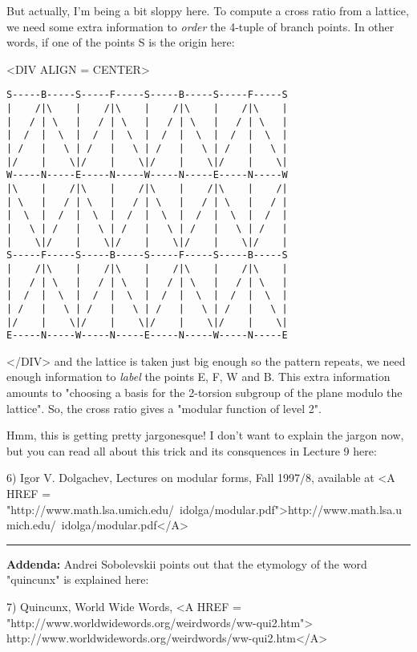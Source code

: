But actually, I'm being a bit sloppy here.  To compute a cross ratio 
from a lattice, we need some extra information to \emph{order} the 4-tuple 
of branch points.  In other words, if one of the points S is the origin
here:

<DIV ALIGN = CENTER>
\begin{verbatim}
S-----B-----S-----F-----S-----B-----S-----F-----S
|    /|\    |    /|\    |    /|\    |    /|\    |
|   / | \   |   / | \   |   / | \   |   / | \   |
|  /  |  \  |  /  |  \  |  /  |  \  |  /  |  \  |
| /   |   \ | /   |   \ | /   |   \ | /   |   \ |
|/    |    \|/    |    \|/    |    \|/    |    \|
W-----N-----E-----N-----W-----N-----E-----N-----W
|\    |    /|\    |    /|\    |    /|\    |    /|
| \   |   / | \   |   / | \   |   / | \   |   / |
|  \  |  /  |  \  |  /  |  \  |  /  |  \  |  /  |
|   \ | /   |   \ | /   |   \ | /   |   \ | /   |
|    \|/    |    \|/    |    \|/    |    \|/    |
S-----F-----S-----B-----S-----F-----S-----B-----S
|    /|\    |    /|\    |    /|\    |    /|\    |
|   / | \   |   / | \   |   / | \   |   / | \   |
|  /  |  \  |  /  |  \  |  /  |  \  |  /  |  \  |
| /   |   \ | /   |   \ | /   |   \ | /   |   \ |
|/    |    \|/    |    \|/    |    \|/    |    \|
E-----N-----W-----N-----E-----N-----W-----N-----E
\end{verbatim}
    
</DIV>
and the lattice is taken just big enough so the pattern 
repeats, we need enough information to \emph{label}
the points E, F, W and B.  This extra information amounts to 
"choosing a basis for the 2-torsion subgroup of the plane modulo 
the lattice".  So, the cross ratio gives a "modular function
of level 2".  

Hmm, this is getting pretty jargonesque!  I don't want to explain the
jargon now, but you can read all about this trick and its consquences 
in Lecture 9 here:

6) Igor V. Dolgachev, Lectures on modular forms, Fall 1997/8,
available at <A HREF = "http://www.math.lsa.umich.edu/~idolga/modular.pdf">http://www.math.lsa.umich.edu/~idolga/modular.pdf</A>

\par\noindent\rule{\textwidth}{0.4pt}
\textbf{Addenda:}  Andrei Sobolevskii points out that the
etymology of the word "quincunx" is explained here:

7) Quincunx, World Wide Words,
<A HREF = "http://www.worldwidewords.org/weirdwords/ww-qui2.htm">
http://www.worldwidewords.org/weirdwords/ww-qui2.htm</A>


